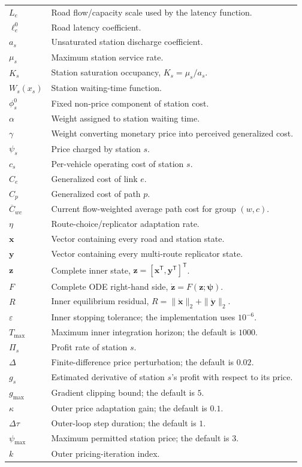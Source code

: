 \documentclass[11pt]{article}
\begin{document}
\begin{longtable}{>{\raggedright\arraybackslash}p{}
                  >{\raggedright\arraybackslash}p{}}
$L_e$ & Road flow/capacity scale used by the latency function. \\
$\ell_e^0$ & Road latency coefficient. \\
$a_s$ & Unsaturated station discharge coefficient. \\
$\mu_s$ & Maximum station service rate. \\
$K_s$ & Station saturation occupancy, $K_s=\mu_s/a_s$. \\
$W_s(x_s)$ & Station waiting-time function. \\
$\phi_s^0$ & Fixed non-price component of station cost. \\
$\alpha$ & Weight assigned to station waiting time. \\
$\gamma$ & Weight converting monetary price into perceived generalized cost. \\
$\psi_s$ & Price charged by station $s$. \\
$c_s$ & Per-vehicle operating cost of station $s$. \\
$C_e$ & Generalized cost of link $e$. \\
$C_p$ & Generalized cost of path $p$. \\
$\overline C_{wc}$ & Current flow-weighted average path cost for group $(w,c)$. \\
$\eta$ & Route-choice/replicator adaptation rate. \\
$\mathbf{x}$ & Vector containing every road and station state. \\
$\mathbf{y}$ & Vector containing every multi-route replicator state. \\
$\mathbf{z}$ & Complete inner state, $\mathbf{z}=[\mathbf{x}^{\mathsf T},\mathbf{y}^{\mathsf T}]^{\mathsf T}$. \\
$F$ & Complete ODE right-hand side, $\dot{\mathbf z}=F(\mathbf z;\boldsymbol\psi)$. \\
$R$ & Inner equilibrium residual, $R=\|\dot{\mathbf{x}}\|_2+\|\dot{\mathbf{y}}\|_2$. \\
$\varepsilon$ & Inner stopping tolerance; the implementation uses $10^{-6}$. \\
$T_{\max}$ & Maximum inner integration horizon; the default is $1000$. \\
$\Pi_s$ & Profit rate of station $s$. \\
$\Delta$ & Finite-difference price perturbation; the default is $0.02$. \\
$g_s$ & Estimated derivative of station $s$'s profit with respect to its price. \\
$g_{\max}$ & Gradient clipping bound; the default is $5$. \\
$\kappa$ & Outer price adaptation gain; the default is $0.1$. \\
$\Delta\tau$ & Outer-loop step duration; the default is $1$. \\
$\psi_{\max}$ & Maximum permitted station price; the default is $3$. \\
$k$ & Outer pricing-iteration index. \\
\bottomrule
\end{longtable}
\end{document}
